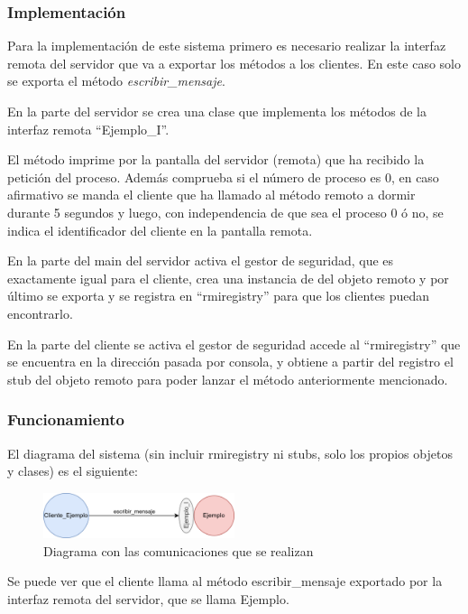 \documentclass{article}
\begin{document}
\subsubsection{Implementación}
Para la implementación de este sistema primero es necesario realizar la interfaz remota del servidor que va a exportar los métodos a los clientes. En este caso solo se exporta el método \textit{escribir\_mensaje}.

En la parte del servidor se crea una clase que implementa los métodos de la interfaz remota ``Ejemplo\_I''.

El método imprime por la pantalla del servidor (remota) que ha recibido la petición del proceso. Además comprueba si el número de proceso es 0, en caso afirmativo se manda el cliente que ha llamado al método remoto a dormir durante 5 segundos y luego, con independencia de que sea el proceso 0 ó no, se indica el identificador del cliente en la pantalla remota.

En la parte del main del servidor activa el gestor de seguridad, que es exactamente igual para el cliente, crea una instancia de del objeto remoto y por último se exporta y se registra en ``rmiregistry'' para que los clientes puedan encontrarlo.

En la parte del cliente se activa el gestor de seguridad accede al ``rmiregistry'' que se encuentra en la dirección pasada por consola, y obtiene a partir del registro el stub del objeto remoto para poder lanzar el método anteriormente mencionado.


\subsubsection{Funcionamiento}
El diagrama del sistema (sin incluir rmiregistry ni stubs, solo los propios objetos y clases) es el siguiente:

\begin{figure}[H]
    \centering
    \includegraphics[width=0.5\textwidth]{imagenes/E1Diagrama.png}
    \caption{Diagrama con las comunicaciones que se realizan}
\end{figure}

Se puede ver que el cliente llama al método escribir\_mensaje exportado por la interfaz remota del servidor, que se llama Ejemplo.
\end{document}
